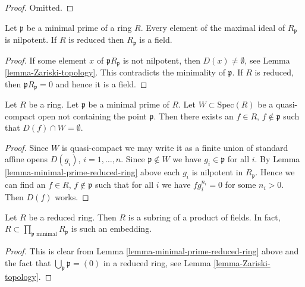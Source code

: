 \begin{proof}
Omitted.
\end{proof}


\begin{lemma}
\label{lemma-minimal-prime-reduced-ring}
Let $\mathfrak p$ be a minimal prime of a ring $R$.
Every element of the maximal ideal of $R_{\mathfrak p}$
is nilpotent. If $R$ is reduced then $R_{\mathfrak p}$
is a field.
\end{lemma}

\begin{proof}
If some element $x$ of ${\mathfrak p}R_{\mathfrak p}$
is not nilpotent, then $D(x) \not = \emptyset$, see
Lemma \ref{lemma-Zariski-topology}. This contradicts
the minimality of $\mathfrak p$. If $R$ is reduced,
then ${\mathfrak p}R_{\mathfrak p} = 0$ and
hence it is a field.
\end{proof}

\begin{lemma}
\label{lemma-standard-open-containing-maximal-point}
Let $R$ be a ring.
Let $\mathfrak p$ be a minimal prime of $R$.
Let $W \subset \text{Spec}(R)$ be a quasi-compact open
not containing the point $\mathfrak p$. Then there
exists an $f \in R$, $f \not \in \mathfrak p$ such
that $D(f) \cap W = \emptyset$.
\end{lemma}

\begin{proof}
Since $W$ is quasi-compact we may write it as a finite union
of standard affine opens $D(g_i)$, $i = 1, \ldots, n$.
Since $\mathfrak p \not \in W$ we have $g_i \in \mathfrak p$ for
all $i$. By Lemma \ref{lemma-minimal-prime-reduced-ring} above
each $g_i$ is nilpotent in $R_{\mathfrak p}$. Hence we can find
an $f \in R$, $f \not \in \mathfrak p$ such that for all $i$ we have
$f g_i^{n_i} = 0$ for some $n_i > 0$. Then $D(f)$ works.
\end{proof}

\begin{lemma}
\label{lemma-reduced-ring-sub-product-fields}
Let $R$ be a reduced ring.
Then $R$ is a subring of a product of fields.
In fact, $R \subset \prod_{\mathfrak p\text{ minimal}} R_{\mathfrak p}$
is such an embedding.
\end{lemma}

\begin{proof}
This is clear from Lemma \ref{lemma-minimal-prime-reduced-ring} above
and the fact that $\bigcup_{\mathfrak p} \mathfrak p = (0)$
in a reduced ring, see Lemma \ref{lemma-Zariski-topology}.
\end{proof}














